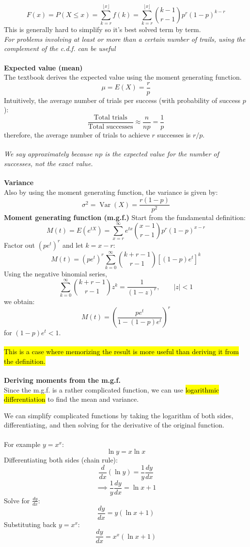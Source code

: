 ﻿\documentclass[12pt]{article}
\begin{document}
\[
F(x)=P(X\leq x)=\sum_{k=r}^{\lfloor x \rfloor}f(k) = \sum_{k=r}^{\lfloor x \rfloor}\binom{k-1}{r-1}p^r(1-p)^{k-r}
\]
This is generally hard to simplify so it's best solved term by term.\\
\textit{For problems involving at least or more than a certain number of trails, using the complement of the c.d.f. can be useful}\\\\
\textbf{Expected value (mean)}\\
The textbook derives the expected value using the moment generating function.
\[
\boxed{\mu=E(X)=\frac{r}{p}}
\]
Intuitively, the average number of trials per success (with probability of success $p$):
\[
\frac{\text{Total trials}}{\text{Total successes}}
\approx \frac{n}{np}=\frac1p
\]
therefore, the average number of trials to achieve \(r\) successes is \(r/p\).\\\\
\textit{We say approximately because $np$ is the expected value for the number of successes, not the exact value.}\\\\
\textbf{Variance}\\
Also by using the moment generating function, the variance is given by:
\[
\boxed{\sigma^2=\operatorname{Var}(X)=\frac{r(1-p)}{p^2}}
\]
\textbf{Moment generating function (m.g.f.)}
Start from the fundamental definition:
\[
M(t)=E(e^{tX})=\sum_{x=r}^{\infty}e^{tx}\binom{x-1}{r-1}p^r(1-p)^{x-r}
\]
Factor out \((pe^t)^r\) and let \(k=x-r\):
\[
M(t)=(pe^t)^r\sum_{k=0}^{\infty}\binom{k+r-1}{r-1}\left[(1-p)e^t\right]^k
\]
Using the negative binomial series,
\[
\sum_{k=0}^{\infty}\binom{k+r-1}{r-1}z^k=\frac{1}{(1-z)^r},\qquad |z|<1
\]
we obtain:
\[
\boxed{M(t)=\left(\frac{pe^t}{1-(1-p)e^t}\right)^r}
\]
for \((1-p)e^t<1\).\\\\
\hl{This is a case where memorizing the result is more useful than deriving it from the definition.}\\\\
\textbf{Deriving moments from the m.g.f.}\\
Since the m.g.f. is a rather complicated function, we can use \hl{logarithmic differentiation} to find the mean and variance.
\begin{notebox}
We can simplify complicated functions by taking the logarithm of both sides, differentiating, and then solving for the derivative of the original function.\\\\
For example $y=x^x$:
\[\ln y = x \ln x\]
Differentiating both sides (chain rule):
\[
\frac{d}{dx}(\ln y)=\frac1y\frac{dy}{dx}
\]
\[\implies 
\frac1y\frac{dy}{dx}=\ln x+1
\]
Solve for \(\frac{dy}{dx}\):
\[
\frac{dy}{dx}=y(\ln x+1)
\]
Substituting back \(y=x^x\):
\[
\frac{dy}{dx}=x^x(\ln x+1)
\]
\end{notebox}
\end{document}
